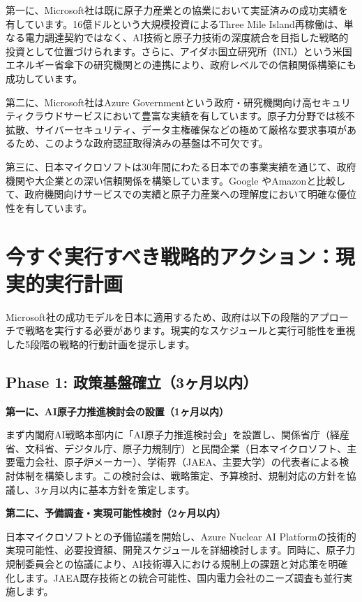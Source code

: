 \documentclass[10pt,a4paper]{jsarticle}
\begin{document}
第一に、Microsoft社は既に原子力産業との協業において実証済みの成功実績を有しています。16億ドルという大規模投資によるThree Mile Island再稼働は、単なる電力調達契約ではなく、AI技術と原子力技術の深度統合を目指した戦略的投資として位置づけられます。さらに、アイダホ国立研究所（INL）という米国エネルギー省傘下の研究機関との連携により、政府レベルでの信頼関係構築にも成功しています。

第二に、Microsoft社はAzure Governmentという政府・研究機関向け高セキュリティクラウドサービスにおいて豊富な実績を有しています。原子力分野では核不拡散、サイバーセキュリティ、データ主権確保などの極めて厳格な要求事項があるため、このような政府認証取得済みの基盤は不可欠です。

第三に、日本マイクロソフトは30年間にわたる日本での事業実績を通じて、政府機関や大企業との深い信頼関係を構築しています。Google やAmazonと比較して、政府機関向けサービスでの実績と原子力産業への理解度において明確な優位性を有しています。

\section{今すぐ実行すべき戦略的アクション：現実的実行計画}

Microsoft社の成功モデルを日本に適用するため、政府は以下の段階的アプローチで戦略を実行する必要があります。現実的なスケジュールと実行可能性を重視した5段階の戦略的行動計画を提示します。

\subsection{Phase 1: 政策基盤確立（3ヶ月以内）}

\textbf{第一に、AI原子力推進検討会の設置（1ヶ月以内）}

まず内閣府AI戦略本部内に「AI原子力推進検討会」を設置し、関係省庁（経産省、文科省、デジタル庁、原子力規制庁）と民間企業（日本マイクロソフト、主要電力会社、原子炉メーカー）、学術界（JAEA、主要大学）の代表者による検討体制を構築します。この検討会は、戦略策定、予算検討、規制対応の方針を協議し、3ヶ月以内に基本方針を策定します。

\textbf{第二に、予備調査・実現可能性検討（2ヶ月以内）}

日本マイクロソフトとの予備協議を開始し、Azure Nuclear AI Platformの技術的実現可能性、必要投資額、開発スケジュールを詳細検討します。同時に、原子力規制委員会との協議により、AI技術導入における規制上の課題と対応策を明確化します。JAEA既存技術との統合可能性、国内電力会社のニーズ調査も並行実施します。
\end{document}
